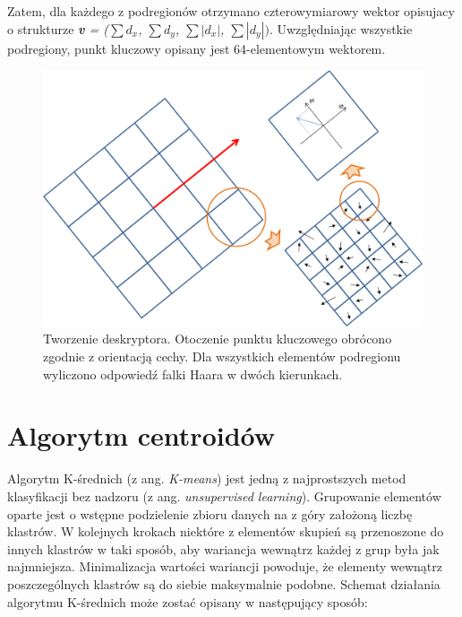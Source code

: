 Zatem, dla każdego z podregionów otrzymano czterowymiarowy wektor opisujacy o strukturze \textit{\textbf{v} = ($\sum$$d_x$, $\sum$$d_y$, $\sum$$|d_x|$, $\sum$$|d_y|)$}. Uwzględniając wszystkie podregiony, punkt kluczowy opisany jest 64-elementowym wektorem. 

 \begin{figure}[h]
	\includegraphics[width=16cm]{Description}
	\centering
	\caption{Tworzenie deskryptora. Otoczenie punktu kluczowego obrócono zgodnie z orientacją cechy. Dla wszystkich elementów podregionu wyliczono odpowiedź falki Haara w dwóch kierunkach.}
	\label{im: Description}
\end{figure}


\section{Algorytm centroidów}
Algorytm K-średnich (z ang. \textit{K-means}) jest jedną z najprostszych metod klasyfikacji bez nadzoru (z ang. \textit{unsupervised learning}). Grupowanie elementów oparte jest o wstępne podzielenie zbioru danych na z góry założoną liczbę klastrów. W kolejnych krokach niektóre z elementów skupień są przenoszone do innych klastrów w taki sposób, aby wariancja wewnątrz każdej z grup była jak najmniejsza. Minimalizacja wartości wariancji powoduje, że elementy wewnątrz poszczególnych klastrów są do siebie maksymalnie podobne. Schemat działania algorytmu K-średnich może zostać opisany w następujący sposób:

